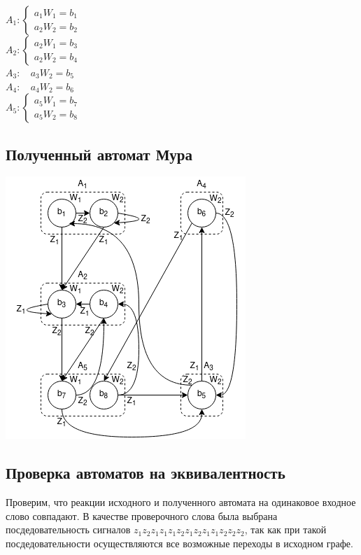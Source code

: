 \documentclass[12pt, a4paper]{article}
\begin{document}
\noindent $A_1 : \begin{cases}
  a_1W_1 = b_1 \\
  a_2W_2 = b_2
\end{cases}$\\
$A_2 : \begin{cases}
  a_2W_1 = b_3 \\
  a_2W_2 = b_4
\end{cases}$\\
$A_3 : \; \; \: \, a_3W_2 = b_5$\\    %
$A_4 : \; \; \: \, a_4W_2 = b_6$\\    %
$A_5 : \begin{cases}
  a_5W_1 = b_7 \\
  a_5W_2 = b_8
\end{cases}$\\

\subsection*{Полученный автомат Мура}

\begin{center}
\includegraphics[scale=0.8]{moore}\\
\end{center}

\subsection*{Проверка автоматов на эквивалентность}

Проверим, что реакции исходного и полученного автомата на одинаковое входное
слово совпадают. В качестве проверочного слова была выбрана посдедовательность
сигналов \texttt{$z_1 z_2 z_1 z_1 z_1 z_2 z_1 z_2 z_1 z_1 z_2 z_2 z_2$}, так
как при такой посдедовательности осуществляются все возможные переходы в
исходном графе.
\end{document}
